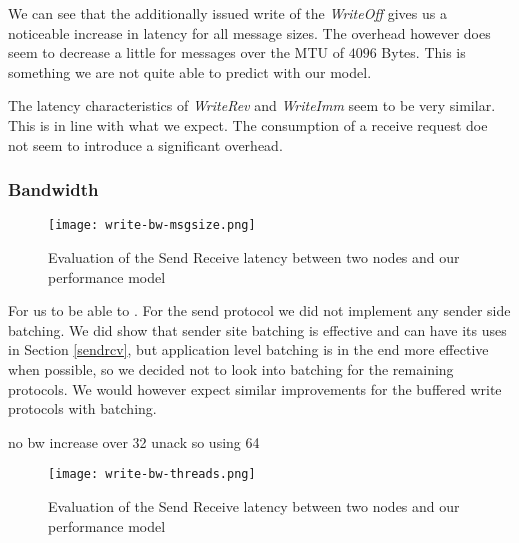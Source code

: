 We can see that the additionally issued write of the \emph{WriteOff} gives us a noticeable increase in latency for all message
sizes. The overhead however does seem to decrease a little for messages over the MTU of $4096$ Bytes. This is something we are
not quite able to predict with our model.

The latency characteristics of \emph{WriteRev} and \emph{WriteImm} seem to be very similar. This is in line with what we 
expect. The consumption of a receive request doe not seem to introduce a significant overhead. 

\subsubsection{Bandwidth}

\begin{figure}[h]
\texttt{[image: write-bw-msgsize.png]}
\caption{Evaluation of the Send Receive latency between two nodes and our performance model}
\label{fig:plot-write-bw-unack}
\end{figure}

For us to be able to . For the send protocol 
we did not implement any sender side batching. We did show that sender site batching is effective and can have its uses in 
Section \ref{sendrcv}, but application level batching is in the end more effective when possible, so we decided not to look 
into batching for the remaining protocols. We would however expect similar improvements for the buffered write 
protocols with batching.

no bw increase over 32 unack so using 64






\begin{figure}[h]
\texttt{[image: write-bw-threads.png]}
\caption{Evaluation of the Send Receive latency between two nodes and our performance model}
\label{fig:plot-write-bw-unack}
\end{figure}


